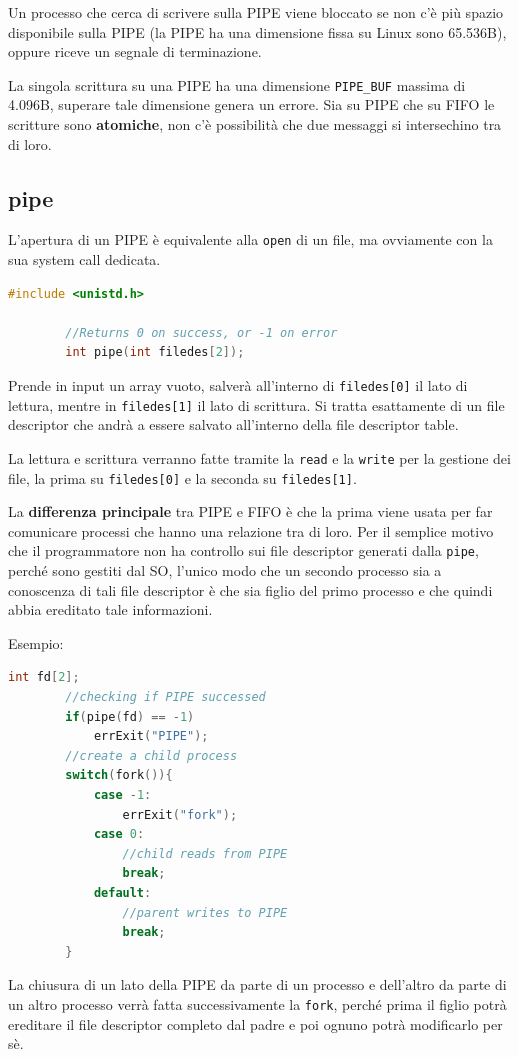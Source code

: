 \documentclass[a4paper, 12pt]{book}
\begin{document}
    Un processo che cerca di scrivere sulla PIPE viene 
    bloccato se non c'è più spazio disponibile sulla 
    PIPE (la PIPE ha una dimensione fissa su Linux sono 
    65.536B), oppure riceve un segnale di terminazione.

    La singola scrittura su una PIPE ha una dimensione \verb|PIPE_BUF|
    massima di 4.096B, superare tale dimensione genera 
    un errore. Sia su PIPE che su FIFO le scritture sono 
    \textbf{atomiche}, non c'è possibilità che due messaggi 
    si intersechino tra di loro.
    
    \subsection{pipe}

    L'apertura di un PIPE è equivalente alla \verb|open| 
    di un file, ma ovviamente con la sua system call dedicata.

    \begin{lstlisting}[language=C]
        #include <unistd.h>

        //Returns 0 on success, or -1 on error 
        int pipe(int filedes[2]);
    \end{lstlisting}
    Prende in input un array vuoto, salverà all'interno 
    di \verb|filedes[0]| il lato di lettura, mentre in 
    \verb|filedes[1]| il lato di scrittura. Si tratta 
    esattamente di un file descriptor che andrà a essere 
    salvato all'interno della file descriptor table.

    La lettura e scrittura verranno fatte tramite la \verb|read| 
    e la \verb|write| per la gestione dei file, la prima su 
    \verb|filedes[0]| e la seconda su \verb|filedes[1]|.

    La \textbf{differenza principale} tra PIPE e FIFO 
    è che la prima viene usata per far comunicare 
    processi che hanno una relazione tra di loro. Per 
    il semplice motivo che il programmatore non ha 
    controllo sui file descriptor generati dalla 
    \verb|pipe|, perché sono gestiti dal SO, l'unico modo 
    che un secondo processo sia a conoscenza di tali 
    file descriptor è che sia figlio del primo processo 
    e che quindi abbia ereditato tale informazioni.

    Esempio:
    \begin{lstlisting}[language=C]
        int fd[2];
        //checking if PIPE successed 
        if(pipe(fd) == -1)
            errExit("PIPE");
        //create a child process 
        switch(fork()){
            case -1:
                errExit("fork");
            case 0:
                //child reads from PIPE 
                break;
            default:
                //parent writes to PIPE 
                break;
        }
    \end{lstlisting}
    La chiusura di un lato della PIPE da parte di un processo 
    e dell'altro da parte di un altro processo verrà fatta 
    successivamente la \verb|fork|, perché prima il figlio 
    potrà ereditare il file descriptor completo dal 
    padre e poi ognuno potrà modificarlo per sè.
\end{document}
